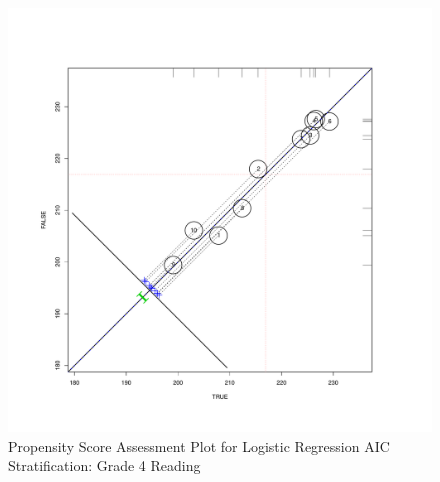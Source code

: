 \clearpage
\begin{figure}
\begin{center}
\includegraphics[height=.4\textheight,width=.4\textheight]{../Figures2009/g4read-circpsa10-AIC.pdf}
\caption{Propensity Score Assessment Plot for Logistic Regression AIC Stratification: Grade 4 Reading}
\end{center}
\end{figure}



